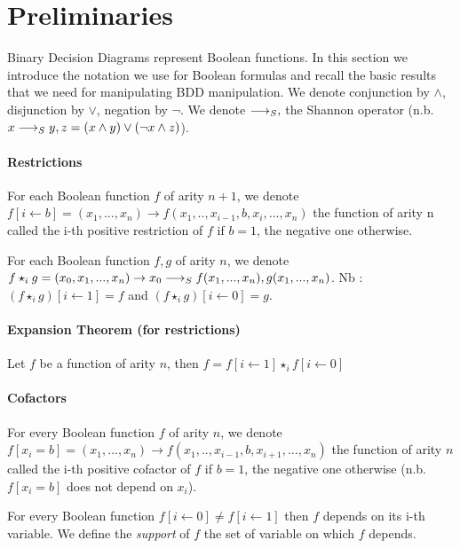 \documentclass[a4paper,10pt]{article}
\begin{document}
\section{Preliminaries}

Binary Decision Diagrams represent Boolean functions. In this section we introduce the notation we use for Boolean formulas and recall the basic results that we need for manipulating BDD manipulation.  We denote conjunction by $\land$, disjunction by $\lor$, negation by $\lnot$. We denote $\longrightarrow_S ,$ the Shannon operator (n.b. $x \longrightarrow_S y, z = (x \land y) \lor (\lnot x \land z)$).

\paragraph{Restrictions\\}

For each Boolean function $f$ of arity $n+1$, we denote $f[i\leftarrow b] = (x_1, ..., x_n) \rightarrow f(x_1, .., x_{i-1}, b, x_i, ..., x_n)$ the function of arity n called the i-th positive restriction of $f$ if $b=1$, the negative one otherwise.


For each Boolean function $f, g$ of arity $n$, we denote $f\star_i g  = (x_0, x_1, ..., x_n) \rightarrow x_0 \longrightarrow_S f(x_1, ..., x_n), g(x_1, ..., x_n)$. Nb : $ (f\star_i g)[i\leftarrow 1] = f$ and $ (f\star_i g)[i\leftarrow 0] = g$.

\paragraph{Expansion Theorem (for restrictions)\\}
Let $f$ be a function of arity $n$, then $f = f[i\leftarrow 1]\star_i f[i\leftarrow 0]$

\paragraph{Cofactors\\}

For every Boolean function $f$ of arity $n$, we denote $f[x_i = b] = (x_1, ..., x_n) \rightarrow f(x_1, .., x_{i-1}, b, x_{i+1}, ..., x_n)$ the function of arity $n$ called the i-th positive cofactor of $f$ if $b=1$, the negative one otherwise (n.b. $f[x_i = b]$ does not depend on $x_i$).


For every Boolean function $f[i\leftarrow 0] \neq f[i \leftarrow 1]$ then $f$ depends on its i-th variable. We define the \textit{support} of $f$ the set of variable on which $f$ depends.
\end{document}
